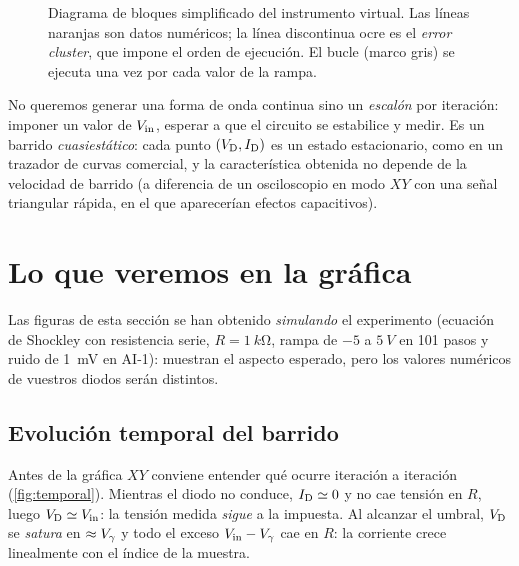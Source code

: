 \documentclass[11pt,a4paper]{article}
\begin{document}
\begin{figure}[htbp]
  \centering
  
  \caption{Diagrama de bloques simplificado del instrumento virtual. Las
  líneas naranjas son datos numéricos; la línea discontinua ocre es el
  \emph{error cluster}, que impone el orden de ejecución. El bucle 
  (marco gris) se ejecuta una vez por cada valor de la rampa.}
  \label{fig:bloques}
\end{figure}

\begin{observacion}
  No queremos generar una forma de onda continua sino un \emph{escalón} por
  iteración: imponer un valor de $V_{\mathrm{in}}$, esperar a que el circuito se
  estabilice y medir. Es un barrido \emph{cuasiestático}: cada punto
  $(V_{\mathrm D},I_{\mathrm D})$ es un estado estacionario, como en un trazador de curvas
  comercial, y la característica obtenida no depende de la velocidad de
  barrido (a diferencia de un osciloscopio en modo $XY$ con una señal
  triangular rápida, en el que aparecerían efectos capacitivos).
\end{observacion}

\section{Lo que veremos en la gráfica}
\label{sec:grafica}

Las figuras de esta sección se han obtenido \emph{simulando} el experimento
(ecuación de Shockley con resistencia serie, $R=\SI{1}{k\ohm}$, rampa de
$-5$ a $\SI{5}{V}$ en 101 pasos y ruido de \SI{1}{mV} en AI-1): muestran el
aspecto esperado, pero los valores numéricos de vuestros diodos serán
distintos.

\subsection{Evolución temporal del barrido}

Antes de la gráfica $XY$ conviene entender qué ocurre iteración a iteración
(\cref{fig:temporal}). Mientras el diodo no conduce, $I_{\mathrm D}\simeq0$ y no cae
tensión en $R$, luego $V_{\mathrm D}\simeq V_{\mathrm{in}}$: la tensión medida \emph{sigue} a la
impuesta. Al alcanzar el umbral, $V_{\mathrm D}$ se \emph{satura} en $\approx V_{\gamma}$ y todo
el exceso $V_{\mathrm{in}}-V_{\gamma}$ cae en $R$: la corriente crece linealmente con el índice
de la muestra.
\end{document}
